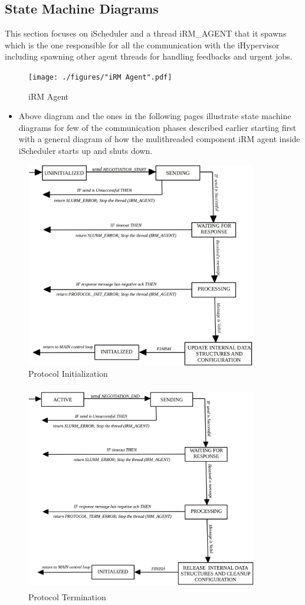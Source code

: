 \subsection{State Machine Diagrams}
This section focuses on iScheduler and a thread iRM\_AGENT that it spawns which is the one responsible for all the communication with the iHypervisor including spawning other agent threads for handling feedbacks and urgent jobs.
\vspace{10mm}
\begin{figure}[h]
\centering
\texttt{[image: ./figures/"iRM Agent".pdf]}
\caption{iRM Agent}
\label{fig:Init}
\end{figure}
\begin{itemize}
\item Above diagram and the ones in the following pages illustrate state machine diagrams for few of the communication phases described earlier starting first with a general diagram of how the mulithreaded component iRM agent inside iScheduler starts up and shuts down.
\end{itemize}
\vspace{-20mm}
\begin{figure}[h]
\centering
\includegraphics[width=0.9\textwidth, height=90mm]{./figures/Init.pdf}
\caption{Protocol Initialization}
\label{fig:Init}
\end{figure}
\vspace{5mm}
\begin{figure}[h]
\centering
\includegraphics[width=0.9\textwidth, height=90mm]{./figures/Term.pdf}
\caption{Protocol Termination}
\label{fig:Term}
\end{figure}
